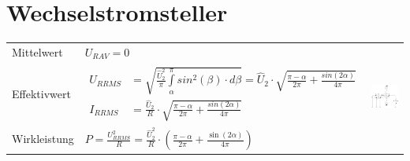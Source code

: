 \section{Wechselstromsteller}

\begin{tabu}{|l|l|p{0.3\textwidth}}
    Mittelwert & $U_{R AV} = 0$
    & \\
    Effektivwert & {$\begin{aligned}
                        U_{R RMS} &= \sqrt{\frac{\hat{U}_{2}^2}{\pi}\int\limits_{\alpha}^{\pi}sin^2(\beta) \cdot d\beta} = \hat{U}_{2} \cdot \sqrt{\frac{\pi-\alpha}{2\pi}+\frac{sin(2\alpha)}{4\pi}}\\
                        I_{R RMS} &=  \frac{\hat{U}_{2}}{R} \cdot \sqrt{\frac{\pi-\alpha}{2\pi}+\frac{sin(2\alpha)}{4\pi}}
                    \end{aligned}$
                   }\\
    Wirkleistung & $P = \frac{U_{R RMS}^2}{R} = \frac{\hat{U}_{2}^2}{R} \cdot \left( \frac{\pi-\alpha}{2\pi} + \frac{\sin(2\alpha)}{4\pi}\right) $\\
\end{tabu}
